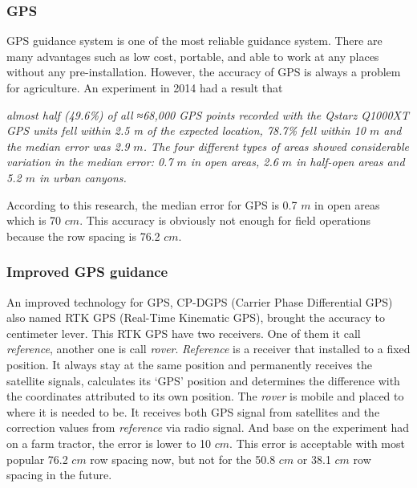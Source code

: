 \documentclass[12pt]{article}
\begin{document}
\begin{flushleft}
\subsubsection{GPS}
GPS guidance system is one of the most reliable guidance system. There are many advantages such as low cost, portable, and able to work at any places without any pre-installation. However, the accuracy of GPS is always a problem for agriculture. An experiment in 2014 had a result that 
\begin{adjustwidth}{0.5 in}{}
	\textit{almost half (49.6\%) of all ≈68,000 GPS points recorded with the Qstarz Q1000XT GPS units fell within 2.5 m of the expected location, 78.7\% fell within 10 $m$ and the median error was 2.9 $m$. The four different types of areas showed considerable variation in the median error: 0.7 $m$ in open areas, 2.6 $m$ in half-open areas and 5.2 $m$ in urban canyons.} \cite{schipperijn2014dynamic}
\end{adjustwidth}
According to this research, the median error for GPS is 0.7 $m$ in open areas which is 70 $cm$. This accuracy is obviously not enough for field operations because the row spacing is 76.2 $cm$.
 
\subsubsection{Improved GPS guidance}
An improved technology for GPS, CP-DGPS (Carrier Phase Differential GPS) also named RTK GPS (Real-Time Kinematic GPS), brought the accuracy to centimeter lever. This RTK GPS have two receivers. One of them it call \textit{reference}, another one is call \textit{rover}. \textit{Reference} is a receiver that installed to a fixed position. It always stay at the same position and permanently receives the satellite signals, calculates its ‘GPS’ position
and determines the difference with the coordinates attributed to its own position. The \textit{rover} is mobile and placed to where it is needed to be. It receives both GPS signal from satellites and the correction values from \textit{reference} via radio signal. \cite{lambiel2004contribution} And base on the experiment had on a farm tractor, the error is lower to 10 $cm$. \cite{thuilot2002automatic} This error is acceptable with most popular 76.2 $cm$ row spacing now, but not for the 50.8 $cm$ or 38.1 $cm$ row spacing in the future. \cite{fawcett2014farm} 


\end{flushleft}
\end{document}
